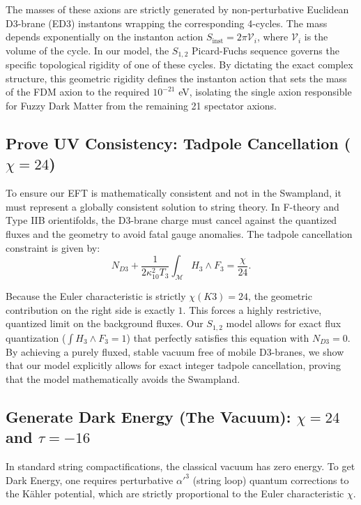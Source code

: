 \documentclass[aps,prd,twocolumn,nofootinbib,superscriptaddress,10pt]{revtex4-2}
\begin{document}
The masses of these axions are strictly generated by non-perturbative Euclidean D3-brane (ED3) instantons wrapping the corresponding 4-cycles. The mass depends exponentially on the instanton action $S_{\text{inst}} = 2\pi \mathcal{V}_i$, where $\mathcal{V}_i$ is the volume of the cycle. In our model, the $S_{1,2}$ Picard-Fuchs sequence governs the specific topological rigidity of one of these cycles. By dictating the exact complex structure, this geometric rigidity defines the instanton action that sets the mass of the FDM axion to the required $10^{-21}$ eV, isolating the single axion responsible for Fuzzy Dark Matter from the remaining 21 spectator axions.

\subsection{Prove UV Consistency: Tadpole Cancellation ($\chi = 24$)}

To ensure our EFT is mathematically consistent and not in the Swampland, it must represent a globally consistent solution to string theory. In F-theory and Type IIB orientifolds, the D3-brane charge must cancel against the quantized fluxes and the geometry to avoid fatal gauge anomalies. The tadpole cancellation constraint is given by:
\begin{equation}
    N_{D3} + \frac{1}{2\kappa_{10}^2 T_3} \int_{\mathcal{M}} H_3 \wedge F_3 = \frac{\chi}{24}.
\end{equation}

Because the Euler characteristic is strictly $\chi(K3) = 24$, the geometric contribution on the right side is exactly $1$. This forces a highly restrictive, quantized limit on the background fluxes. Our $S_{1,2}$ model allows for exact flux quantization ($\int H_3 \wedge F_3 = 1$) that perfectly satisfies this equation with $N_{D3} = 0$. By achieving a purely fluxed, stable vacuum free of mobile D3-branes, we show that our model explicitly allows for exact integer tadpole cancellation, proving that the model mathematically avoids the Swampland.

\subsection{Generate Dark Energy (The Vacuum): $\chi = 24$ and $\tau = -16$}

In standard string compactifications, the classical vacuum has zero energy. To get Dark Energy, one requires perturbative $\alpha'^3$ (string loop) quantum corrections to the Kähler potential, which are strictly proportional to the Euler characteristic $\chi$. 
\end{document}
